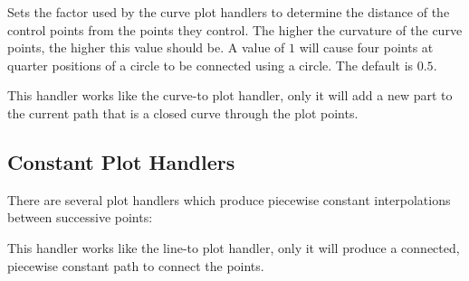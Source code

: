 \begin{command}{\pgfsetplottension{}}
    Sets the factor used by the curve plot handlers to determine the distance
    of the control points from the points they control. The higher the
    curvature of the curve points, the higher this value should be. A value of
    $1$ will cause four points at quarter positions of a circle to be connected
    using a circle. The default is $0.5$.
\begin{codeexample}[]
\end{codeexample}
\end{command}

\begin{command}{\pgfplothandlerclosedcurve}
    This handler works like the curve-to plot handler, only it will add a new
    part to the current path that is a closed curve through the plot points.
\begin{codeexample}[]
\end{codeexample}
\end{command}


\subsection{Constant Plot Handlers}

There are several plot handlers which produce piecewise constant interpolations
between successive points:

\begin{command}{\pgfplothandlerconstantlineto}
    This handler works like the line-to plot handler, only it will produce a
    connected, piecewise constant path to connect the points.
\begin{codeexample}[]
\end{codeexample}
\end{command}

